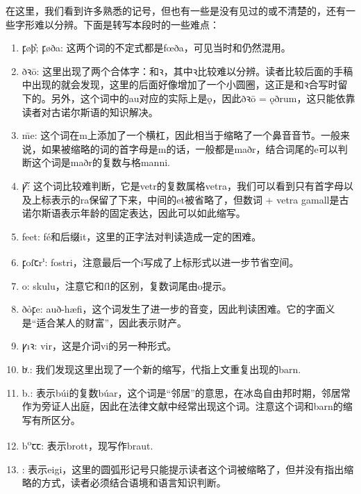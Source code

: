 在这里，我们看到许多熟悉的记号，但也有一些是没有见过的或不清楚的，还有一些字形难以分辨。下面是转写本段时的一些难点：
\begin{enumerate}[itemindent=1em, label=\textbf{\arabic*}.]
    \item {\medieval ꝼøþ͛; ꝼøða}: 这两个词的不定式都是fœða，可见当时\th 和\dh 仍然混用。

    \item {ðꝛ\=o}: 这里出现了两个合体字：{}和{\medieval ꝛ}，其中{\medieval ꝛ}比较难以分辨。读者比较后面的手稿中出现的\dh 就会发现，这里的\dh 后面好像增加了一个小圆圈，这正是和{\medieval ꝛ}合写时留下的。另外，这个词中的au对应的实际上是\k{o}，因此{ðꝛ\=o} = ǫðrum，这只能依靠读者对古诺尔斯语的知识解决。

    \item {\medieval \=me}: 这个词在m上添加了一个横杠，因此相当于缩略了一个鼻音音节。一般来说，如果被缩略的词的首字母是m的话，一般都是maðr，结合词尾的e可以判断这个词是maðr的复数与格manni.

    \item {\medieval ꝩᷓ}: 这个词比较难判断，它是vetr的复数属格vetra，我们可以看到只有首字母以及上标表示的ra保留了下来，中间的et被省略了，但数词 + vetra gamall是古诺尔斯语表示年龄的固定表达，因此可以如此缩写。

    \item {\medieval feet}: fé和后缀it，这里的正字法对判读造成一定的困难。

    \item {\medieval ꝼoſꞇr\textsuperscript{ı}}: fostri，注意最后一个i写成了上标形式以进一步节省空间。

    \item {o}: skulu，注意它和{ſ\l}的区别，复数词尾由o提示。

    \item {ðỏꝼe}: auð-hæfi，这个词发生了进一步的音变，因此判读困难。它的字面义是“适合某人的财富”，因此表示财产。

    \item {\medieval ꝩı\dh ꝛ}: vi\dh r，这是介词vi\dh 的另一种形式。

    \item {\medieval bͬ.}: 我们发现这里出现了一个新的缩写，代指上文重复出现的barn.

    \item {\medieval b.}: 表示búi的复数búar，这个词是“邻居”的意思，在冰岛自由邦时期，邻居常作为旁证人出庭，因此在法律文献中经常出现这个词。注意这个词和barn的缩写有所区分。

    \item {\medieval b\textsuperscript{o}ꞇꞇ}: 表示brott，现写作braut.

    \item {\medieval {}}: 表示eigi，这里的圆弧形记号只能提示读者这个词被缩略了，但并没有指出缩略的方式，读者必须结合语境和语言知识判断。

\end{enumerate}
\hspace*{\fill}\\

